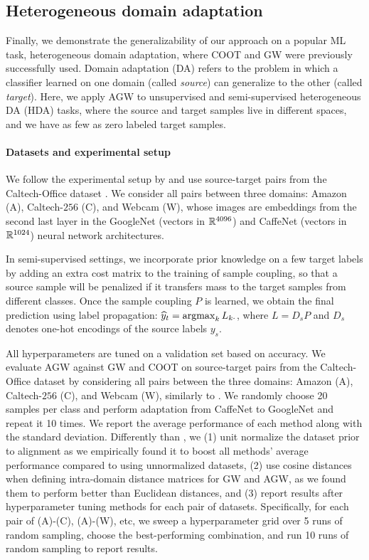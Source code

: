 \subsection{Heterogeneous domain adaptation}

Finally, we demonstrate the generalizability of our approach on a popular ML task,
heterogeneous domain adaptation, where COOT and GW were previously successfully used.
Domain adaptation (DA) refers to the problem in which a classifier learned on one domain
(called \textit{source}) can generalize to the other (called \textit{target}). Here,
we apply AGW to unsupervised and semi-supervised heterogeneous DA (HDA) tasks,
where the source and target samples live in different spaces, and we have as few as
zero labeled target samples.

\paragraph{Datasets and experimental setup}
We follow the experimental setup by \citep{Redko20} and use source-target pairs
from the Caltech-Office dataset \citep{Saenko10}. We consider all pairs between three domains:
Amazon (A), Caltech-$256$ (C), and Webcam (W), whose images are embeddings from
the second last layer in the GoogleNet \citep{Szegedy15} (vectors in $\mathbb R^{4096}$)
and CaffeNet \citep{Jia14} (vectors in $\mathbb R^{1024}$) neural network architectures.

In semi-supervised settings, we incorporate prior knowledge on a few target labels
by adding an extra cost matrix to the training of sample coupling, so that
a source sample will be penalized if it transfers mass to the target samples from different classes.
Once the sample coupling $P$ is learned, we obtain the final prediction using label propagation:
$\widehat{y}_t = \operatorname*{argmax}_k L_{k\cdot}$,
where $L = D_s P$ and $D_s$ denotes one-hot encodings of the source labels $y_s$.

All hyperparameters are tuned on a validation set based on accuracy.
We evaluate AGW against GW and COOT on source-target pairs from the Caltech-Office dataset
\citep{Saenko10} by considering all pairs between the three domains: Amazon (A), Caltech-$256$ (C),
and Webcam (W), similarly to \citep{Redko20}. We randomly choose 20 samples per class
and perform adaptation from CaffeNet to GoogleNet and repeat it 10 times.
We report the average performance of each method along with the standard deviation.
Differently than \citep{Redko20}, we (1) unit normalize the dataset prior to alignment
as we empirically found it to boost all methods' average performance compared to using
unnormalized datasets, (2) use cosine distances when defining intra-domain distance matrices
for GW and AGW, as we found them to perform better than Euclidean distances,
and (3) report results after hyperparameter tuning methods for each pair of datasets.
Specifically, for each pair of (A)-(C), (A)-(W), etc, we sweep a hyperparameter grid over
5 runs of random sampling, choose the best-performing combination, and run
10 runs of random sampling to report results.


